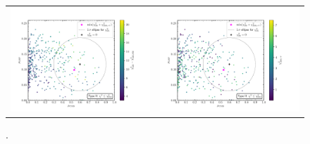 \documentclass[12pt]{article}
\begin{document}
\begin{figure}[ht!]
	\begin{center}
		\begin{tabular}{cc}
			\centering
			\hspace*{-3mm}
			\includegraphics[scale=0.40]{figs/2_hs.pdf} &
			\includegraphics[scale=0.40]{figs/2_ll.pdf}
		\end{tabular}
		\caption{.}
		\label{fig:typeiimu}
	\end{center}
\end{figure}
\end{document}
